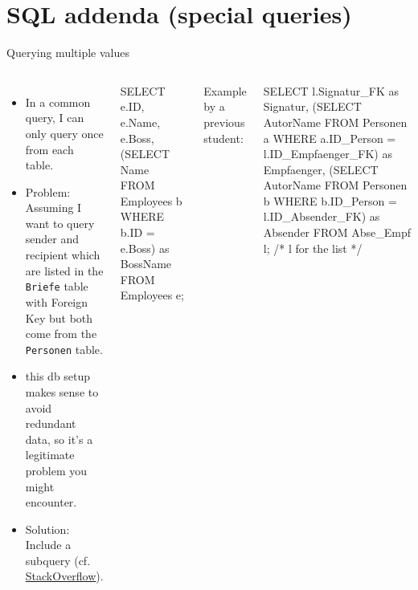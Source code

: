 \section{SQL addenda (special queries)}
\begin{frame}{Querying multiple values}
\footnotesize

\begin{columns}
  \begin{itemize}
      \item In a common query, I can only query once from each table.
      \item \alert{Problem:} Assuming I want to query sender and recipient which are listed in the \texttt{Briefe} table with Foreign Key but both come from the \texttt{Personen} table.
      \item this db setup makes sense to avoid redundant data, so it's a legitimate problem you might encounter.
      \item \alert{Solution:} Include a subquery (cf. \href{https://stackoverflow.com/questions/41450663/selecting-same-column-twice-from-a-single-table-but-with-different-conditions}{StackOverflow}).
  \end{itemize}
\begin{sqlcode}
SELECT
    e.ID, 
    e.Name, 
    e.Boss, 
    (SELECT Name FROM Employees b 
     WHERE b.ID = e.Boss) as BossName
FROM Employees e;
\end{sqlcode}
Example by a previous student:
\begin{sqlcode}
SELECT l.Signatur_FK as Signatur, 
 (SELECT AutorName FROM Personen a 
  WHERE a.ID_Person = l.ID_Empfaenger_FK)
  as Empfaenger,  
 (SELECT AutorName FROM Personen b 
  WHERE b.ID_Person = l.ID_Absender_FK)
  as Absender 
FROM Abse_Empf l; /* l for the list */
\end{sqlcode}

\end{columns}

\end{frame}






